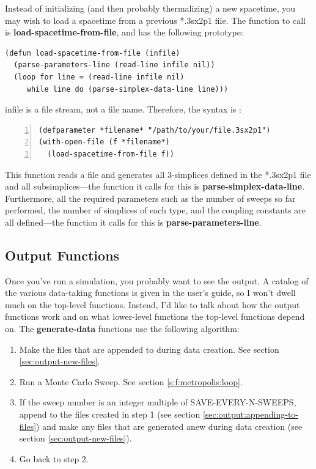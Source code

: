 \documentclass[12pt]{article}
\begin{document}
Instead of initializing (and then probably thermalizing) a new
spacetime, you may wish to load a spacetime from a previous *.3sx2p1
file. The function to call is \textbf{load-spacetime-from-file}, and
has the following prototype:
\begin{lstlisting}
(defun load-spacetime-from-file (infile)
  (parse-parameters-line (read-line infile nil))
  (loop for line = (read-line infile nil)
     while line do (parse-simplex-data-line line)))
\end{lstlisting}
infile is a file stream, not a file name. Therefore, the syntax is :
\begin{lstlisting}[numbers=left]
(defparameter *filename* "/path/to/your/file.3sx2p1")
(with-open-file (f *filename*)
  (load-spacetime-from-file f))
\end{lstlisting}
This function reads a file and generates all 3-simplices defined in
the *.3sx2p1 file and all subsimplices---the function it calls for
this is \textbf{parse-simplex-data-line}. Furthermore, all the
required parameters such as the number of sweeps so far performed, the
number of simplices of each type, and the coupling constants are all
defined---the function it calls for this is
\textbf{parse-parameters-line}.


\subsection{Output Functions}
\label{subsec:output}

Once you've run a simulation, you probably want to see the output. A
catalog of the various data-taking functions is given in the user's
guide, so I won't dwell much on the top-level functions. Instead, I'd
like to talk about how the output functions work and on what
lower-level functions the top-level functions depend on. The
\textbf{generate-data} functions use the following algorithm:
\begin{enumerate}
\item Make the files that are appended to during data creation. See
  section \ref{sec:output-new-files}.
\item Run a Monte Carlo Sweep. See section \ref{s:f:metropolis:loop}.
\item If the sweep number is an integer multiple of
  SAVE-EVERY-N-SWEEPS, append to the files created in step 1 (see
  section \ref{sec:output:appending-to-files}) and make any files that
  are generated anew during data creation (see section
  \ref{sec:output-new-files}).
\item Go back to step 2.
\end{enumerate}
\end{document}
